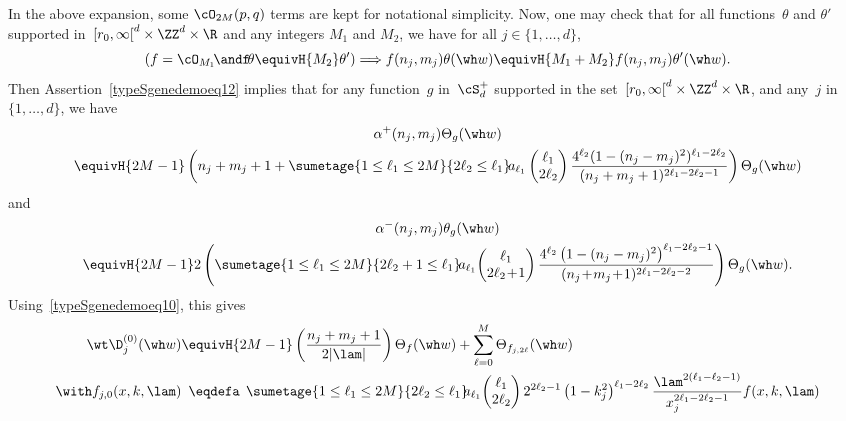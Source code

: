 In the above expansion, some $\cO_{2M}(p,q)$ terms are kept for notational simplicity. Now, one may check that for all functions~$\theta$ and $\theta'$ supported in~$[r_0,\infty\mathclose{[}^d\times \ZZ^d\times \R$ and any integers $M_1$ and $M_2$, we have for all $j\in\{1,\dots,d\}$,
\begin{equation}\label{typeSgenedemoeq10}
\left(f=\cO_{M_1} \!\andf \! \theta \equivH {M_2} \theta'\right) \Longrightarrow f(n_j,m_j) \theta(\wh w) \equivH {M_1+M_2} f(n_j,m_j) \theta'(\wh w).
\end{equation}
Then Assertion~\eqref{typeSgenedemoeq12} implies that for any function~$g $ in~$\cS_d^+$ supported in the set~$[r_0,\infty\mathclose{[}^d\times \ZZ^d\times \R$, and any~$j$ in~$\{1,\dots,d\}$, we have
\begin{multline}\label{eq:alpha+}
\alpha^+(n_j,m_j) \Theta_g(\wh w) \\
\equivH {2M-1} \left(n_j+m_j+1
+\sumetage {1\leq \ell_1\leq 2M} {2\ell_2\leq \ell_1} \! a_{\ell_1}
\begin{pmatrix} \ell_1 \\ 2\ell_2
\end{pmatrix} \frac {4^{\ell_2} (1-(n_j-m_j)^2)^{\ell_1-2\ell_2} } {(n_j+m_j+1)^{2\ell_1-2\ell_2-1}}\right) \Theta_g(\wh w)
\end{multline}
and
\begin{multline}\label{eq:alpha-}
\alpha^-(n_j,m_j) \theta_g(\wh w) \\ \equivH {2M-1} 2\left(\sumetage {1\leq \ell_1\leq 2M} {2\ell_2+1\leq \ell_1} \!a_{\ell_1}\!
\begin{pmatrix} \ell_1 \\ 2\ell_2\!+\!1
\end{pmatrix} \frac {4^{\ell_2}
\left(1-(n_j-m_j)^2\right)^{\ell_1-2\ell_2-1} } {(n_j\!+\!m_j\!+\!1)^{2\ell_1-2\ell_2-2}}\right) \Theta_g(\wh w).
\end{multline}
Using~\eqref{typeSgenedemoeq10}, this gives
\[
\begin{aligned}
\wt \D_j^{(0)} (\wh w) &\equivH{2M-1} \left(\frac {n_j+m_j+1} {2|\lam|}\right) \Theta_f(\wh w) +\sum_{\ell=0}^M \Theta_{f_{j,2\ell}}(\wh w) \\ \with
f_{j,0} (x,k,\lam) &\;\:\eqdefa\;\, \sumetage {1\leq \ell_1\leq 2M} {2\ell_2\leq \ell_1}\!\! a_{\ell_1}\!
\begin{pmatrix} \ell_1 \\ 2\ell_2
\end{pmatrix} 2^{2\ell_2-1} \left(1-k_j^2\right)^{\ell_1-2\ell_2} \frac { \lam^{2(\ell_1-\ell_2-1)}} {x_j^{2\ell_1-2\ell_2-1}} f(x,k,\lam)
\end{aligned}
\]
